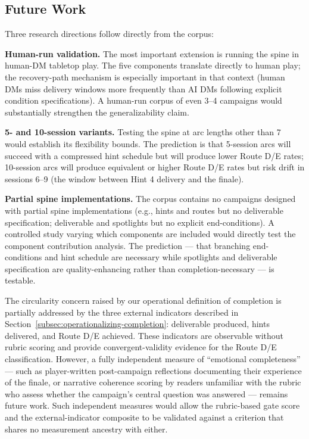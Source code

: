 \subsection{Future Work}

Three research directions follow directly from the corpus:

\textbf{Human-run validation.} The most important extension is running the spine
in human-DM tabletop play. The five components translate directly to human play;
the recovery-path mechanism is especially important in that context (human DMs
miss delivery windows more frequently than AI DMs following explicit condition
specifications). A human-run corpus of even 3--4 campaigns would substantially
strengthen the generalizability claim.

\textbf{5- and 10-session variants.} Testing the spine at arc lengths other than
7 would establish its flexibility bounds. The prediction is that 5-session arcs
will succeed with a compressed hint schedule but will produce lower Route D/E
rates; 10-session arcs will produce equivalent or higher Route D/E rates but risk
drift in sessions 6--9 (the window between Hint 4 delivery and the finale).

\textbf{Partial spine implementations.} The corpus contains no campaigns designed
with partial spine implementations (e.g., hints and routes but no deliverable
specification; deliverable and spotlights but no explicit end-conditions). A
controlled study varying which components are included would directly test the
component contribution analysis. The prediction --- that branching end-conditions
and hint schedule are necessary while spotlights and deliverable specification
are quality-enhancing rather than completion-necessary --- is testable.

The circularity concern raised by our operational definition of completion is
partially addressed by the three external indicators described in
Section~\ref{subsec:operationalizing-completion}: deliverable produced, hints
delivered, and Route D/E achieved. These indicators are observable without
rubric scoring and provide convergent-validity evidence for the Route D/E
classification. However, a fully independent measure of ``emotional completeness''
--- such as player-written post-campaign reflections documenting their
experience of the finale, or narrative coherence scoring by readers unfamiliar
with the rubric who assess whether the campaign's central question was answered ---
remains future work. Such independent measures would allow the rubric-based gate
score and the external-indicator composite to be validated against a criterion
that shares no measurement ancestry with either.
